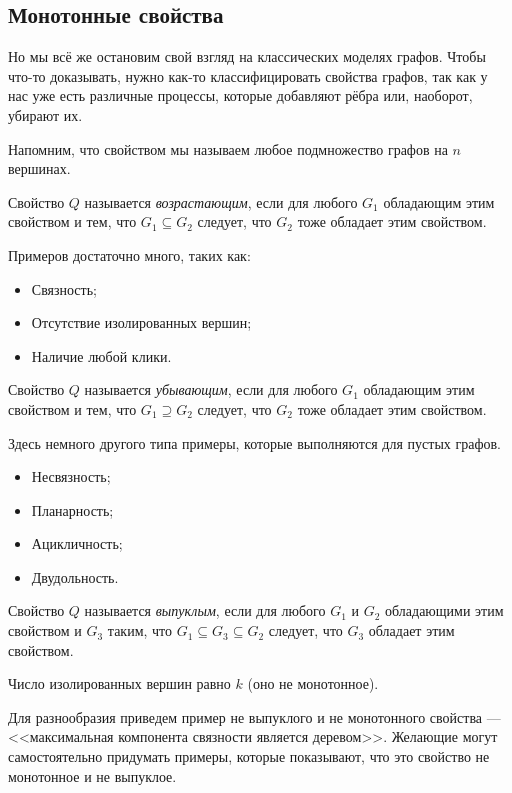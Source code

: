 \subsection{Монотонные свойства}

Но мы всё же остановим свой взгляд на классических моделях графов. Чтобы
что-то доказывать, нужно как-то классифицировать свойства графов, так как у нас
уже есть различные процессы, которые добавляют рёбра или, наоборот, убирают их.

Напомним, что свойством мы называем любое подмножество графов на $n$ вершинах.

\begin{definition}
  Свойство $Q$ называется \textit{возрастающим}, если для любого $G_1$ обладающим
  этим свойством и тем, что $G_1 \subseteq G_2$ следует, что $G_2$ тоже обладает
  этим свойством.
\end{definition}

\begin{example}
  Примеров достаточно много, таких как:
  \begin{itemize}
    \item Связность;
    \item Отсутствие изолированных вершин;
    \item Наличие любой клики.
  \end{itemize}
\end{example}

\begin{definition}
  Свойство $Q$ называется \textit{убывающим}, если для любого $G_1$ обладающим
  этим свойством и тем, что $G_1 \supseteq G_2$ следует, что $G_2$ тоже обладает
  этим свойством.
\end{definition}

\begin{example}
  Здесь немного другого типа примеры, которые выполняются для пустых графов.
  \begin{itemize}
    \item Несвязность;
    \item Планарность;
    \item Ацикличность;
    \item Двудольность.
  \end{itemize}
\end{example}

\begin{definition}
  Свойство $Q$ называется \textit{выпуклым}, если для любого $G_1$ и $G_2$ обладающими
  этим свойством и $G_3$ таким, что $G_1 \subseteq G_3 \subseteq G_2$ следует,
  что $G_3$ обладает этим свойством.
\end{definition}

\begin{example}
  Число изолированных вершин равно $k$ (оно не монотонное).
\end{example}

Для разнообразия приведем пример не выпуклого и не монотонного свойства --- 
<<максимальная компонента связности является деревом>>. Желающие могут самостоятельно
придумать примеры, которые показывают, что это свойство не монотонное и не выпуклое.

